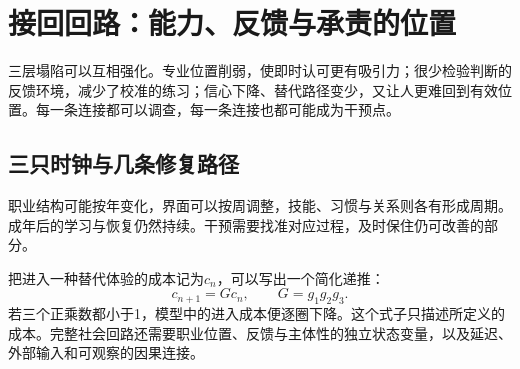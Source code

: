 \section{接回回路：能力、反馈与承责的位置}

三层塌陷可以互相强化。专业位置削弱，使即时认可更有吸引力；很少检验判断的反馈环境，减少了校准的练习；信心下降、替代路径变少，又让人更难回到有效位置。每一条连接都可以调查，每一条连接也都可能成为干预点。

\subsection{三只时钟与几条修复路径}

职业结构可能按年变化，界面可以按周调整，技能、习惯与关系则各有形成周期。成年后的学习与恢复仍然持续。干预需要找准对应过程，及时保住仍可改善的部分。

把进入一种替代体验的成本记为$c_n$，可以写出一个简化递推：
\begin{equation}
c_{n+1}=Gc_n,\qquad G=g_1g_2g_3.
\end{equation}
若三个正乘数都小于1，模型中的进入成本便逐圈下降。这个式子只描述所定义的成本。完整社会回路还需要职业位置、反馈与主体性的独立状态变量，以及延迟、外部输入和可观察的因果连接。

